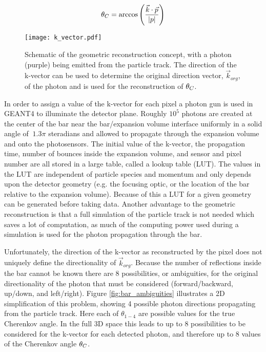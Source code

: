 \begin{equation}
	\theta_{C} = \arccos\left(\frac{\vec{k}\cdot\vec{p}}{|p|}\right)
\end{equation}

\begin{figure}[!htb]
	\centering
	\texttt{[image: k\_vector.pdf]}
	\caption{Schematic of the geometric reconstruction concept, with a photon (purple) being emitted from the particle track. The direction of the k-vector can be used to determine the original direction vector, $\vec{k}_{org}$, of the photon and is used for the reconstruction of $\theta_{C}$.}
	\label{fig:k_vector}
\end{figure}

In order to assign a value of the k-vector for each pixel a photon gun is used in GEANT4 to illuminate the detector plane. Roughly $10^5$ photons are created at the center of the bar near the bar/expansion volume interface uniformly in a solid angle of $~1.3\pi$ steradians and allowed to propagate through the expansion volume and onto the photosensors. The initial value of the k-vector, the propagation time,  number of bounces inside the expansion volume, and sensor and pixel number are all stored in a large table, called a lookup table (LUT). The values in the LUT are independent of particle species and momentum and only depends upon the detector geometry (e.g. the focusing optic, or the location of the bar relative to the expansion volume). Because of this a LUT for a given geometry can be generated before taking data. Another advantage to the geometric reconstruction is that a full simulation of the particle track is not needed which saves a lot of computation, as much of the computing power used during a simulation is used for the photon propagation through the bar.

Unfortunately, the direction of the k-vector as reconstructed by the pixel does not uniquely define the directionality of $\vec{k}_{org}$. Because the number of reflections inside the bar cannot be known there are 8 possibilities, or ambiguities, for the original directionality of the photon that must be considered (forward/backward, up/down, and left/right). Figure \ref{fig:bar_ambiguities} illustrates a 2D simplification of this problem, showing 4 possible photon directions propagating from the particle track. Here each of $\theta_{1-4}$ are possible values for the true Cherenkov angle. In the full 3D space this leads to up to 8 possibilities to be considered for the k-vector for each detected photon, and therefore up to 8 values of the Cherenkov angle $\theta_{C}$.

